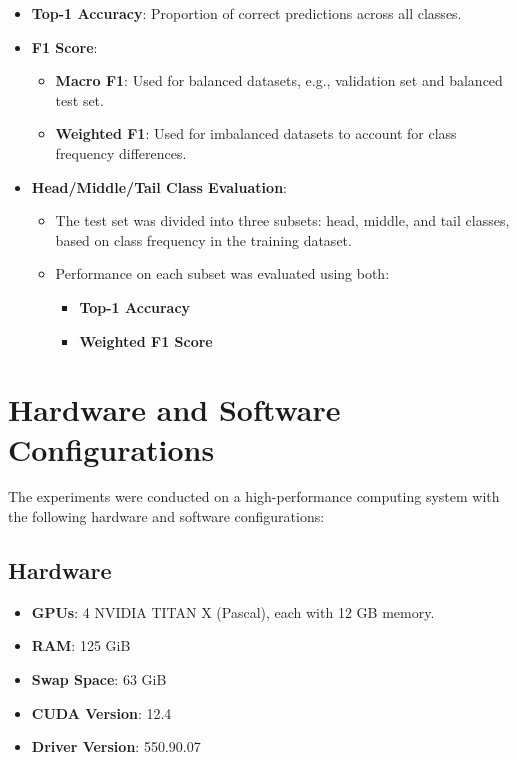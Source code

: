 \begin{itemize}
    \item \textbf{Top-1 Accuracy}: Proportion of correct predictions across all classes.
    \item \textbf{F1 Score}:
    \begin{itemize}
        \item \textbf{Macro F1}: Used for balanced datasets, e.g., validation set and balanced test set.
        \item \textbf{Weighted F1}: Used for imbalanced datasets to account for class frequency differences.
    \end{itemize}
    \item \textbf{Head/Middle/Tail Class Evaluation}: 
    \begin{itemize}
        \item The test set was divided into three subsets: head, middle, and tail classes, based on class frequency in the training dataset.
        \item Performance on each subset was evaluated using both:
        \begin{itemize}
            \item \textbf{Top-1 Accuracy}
            \item \textbf{Weighted F1 Score}
        \end{itemize}
    \end{itemize}
\end{itemize}


\section{Hardware and Software Configurations}
The experiments were conducted on a high-performance computing system with the following hardware and software configurations:

\subsection{Hardware}
\begin{itemize}
    \item \textbf{GPUs}: 4 NVIDIA TITAN X (Pascal), each with 12 GB memory.
    \item \textbf{RAM}: 125 GiB
    \item \textbf{Swap Space}: 63 GiB
    \item \textbf{CUDA Version}: 12.4
    \item \textbf{Driver Version}: 550.90.07
\end{itemize}

